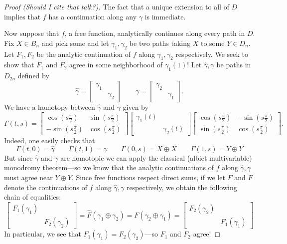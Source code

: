 \begin{proof}
  [Proof (Should I cite that talk?)]
  The fact that a unique extension to all of \(D\) implies that \(f\) has a
  continuation along any \(\gamma\) is immediate.

  Now suppose that \(f\), a free function, analytically continues along every
  path in \(D\). Fix \(X \in B_n\) and pick some and let \(\gamma_1,\gamma_2\)
  be two paths taking \(X\) to some \(Y \in D_n\). Let \(F_1,F_2\) be the
  analytic continuation of \(f\) along \(\gamma_1,\gamma_2\) respectively. We
  seek to show that
  \(F_1\) and \(F_2\) agree in some neighborhood of \(\gamma_1(1)\)! Let \(\hat{\gamma}, \gamma\) be paths in
  \(D_{2n}\) defined by
  \[
    \hat{\gamma} = \begin{bmatrix} \gamma_1&\\&\gamma_2 \end{bmatrix} \qquad
    \gamma = \begin{bmatrix} \gamma_2&\\&\gamma_1 \end{bmatrix}.
  \]
  We have a homotopy between \(\hat{\gamma}\) and \(\gamma\) given by
  \[
    \Gamma(t,s) =
    \begin{bmatrix} \cos (s\frac{\pi}{2}) & \sin (s\frac{\pi}{2})\\-\sin (s\frac{\pi}{2}) & \cos (s\frac{\pi}{2}) \end{bmatrix}
    \begin{bmatrix} \gamma_1(t)&\\&\gamma_2(t) \end{bmatrix}
    \begin{bmatrix} \cos (s\frac{\pi}{2}) & -\sin (s\frac{\pi}{2})\\\sin (s\frac{\pi}{2}) & \cos (s\frac{\pi}{2}) \end{bmatrix}.
  \]
  Indeed, one easily checks that
  \[
    \Gamma(t,0) = \hat{\gamma}\qquad
    \Gamma(t,1) = \gamma \quad \quad
    \Gamma(0,s) = X\oplus X\qquad
    \Gamma(1,s) = Y \oplus Y
  \]
  But since \(\hat{\gamma}\) and \(\gamma\) are homotopic we can apply the
  classical (albiet multivariable) monodromy theorem---so we know that the
  analytic continuations of \(f\) along \(\hat{\gamma},\gamma\) must agree near
  \(Y \oplus Y\). Since free functions respect direct sums, if we let
  \(\hat{F}\) and \(F\) denote the continuations of \(f\) along
  \(\hat{\gamma},\gamma\) respectively, we obtain the
  following chain of equalities:
  \[
    \begin{bmatrix} F_1(\gamma_1) &\\&F_2(\gamma_2) \end{bmatrix}  =
    \hat{F}(\gamma_1 \oplus \gamma_2) = F (\gamma_2 \oplus \gamma_1) =
    \begin{bmatrix} F_2(\gamma_2)& \\ & F_1(\gamma_1) \end{bmatrix}
  \]
  In particular, we see that \(F_1(\gamma_1)=F_2(\gamma_2)\)---so \(F_1\) and
  \(F_2\) agree!
\end{proof}

